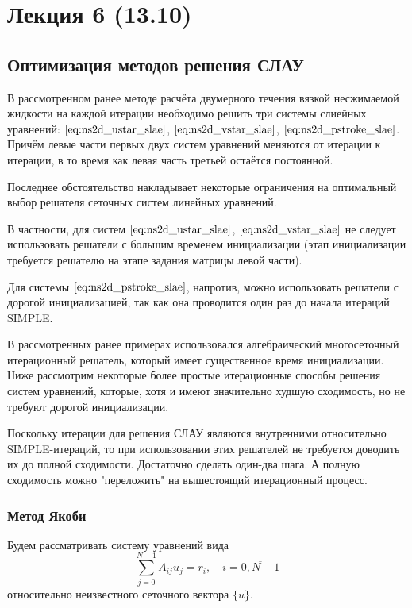 \section{Лекция 6 (13.10)}

\subsection{Оптимизация методов решения СЛАУ}

В рассмотренном ранее методе расчёта двумерного течения вязкой несжимаемой жидкости
на каждой итерации необходимо решить три системы слиейных уравнений: $\eqref{eq:ns2d_ustar_slae}$,
$\eqref{eq:ns2d_vstar_slae}$, $\eqref{eq:ns2d_pstroke_slae}$.
Причём левые части первых двух систем уравнений меняются от итерации к итерации, в то
время как левая часть третьей остаётся постоянной.

Последнее обстоятельство накладывает некоторые ограничения на
оптимальный выбор решателя сеточных систем линейных уравнений.

В частности, для систем
$\eqref{eq:ns2d_ustar_slae}$,
$\eqref{eq:ns2d_vstar_slae}$ не следует использовать решатели
с большим временем инициализации (этап инициализации требуется решателю
на этапе задания матрицы левой части).

Для системы
$\eqref{eq:ns2d_pstroke_slae}$, напротив,
можно использовать решатели с дорогой инициализацией, так как
она проводится один раз до начала итераций SIMPLE.

В рассмотренных ранее примерах использовался алгебраический
многосеточный итерационный решатель, который имеет существенное время
инициализации. Ниже рассмотрим некоторые более простые итерационные способы решения систем
уравнений, которые, хотя и имеют значительно худшую сходимость, но не требуют дорогой инициализации.

Поскольку итерации для решения СЛАУ являются внутренними относительно SIMPLE-итераций,
то при использовании этих решателей не требуется доводить их до полной сходимости.
Достаточно сделать один-два шага. А полную сходимость можно "переложить" на вышестоящий
итерационный процесс.

\subsubsection{Метод Якоби}
\label{sec:SLAE-Jacobi}

Будем рассматривать систему уравнений вида
\begin{equation*}
    \sum_{j=0}^{N-1} A_{ij} u_j = r_i, \quad i = \overline{0, N-1}
\end{equation*}
относительно неизвестного сеточного вектора $\{u\}$.

